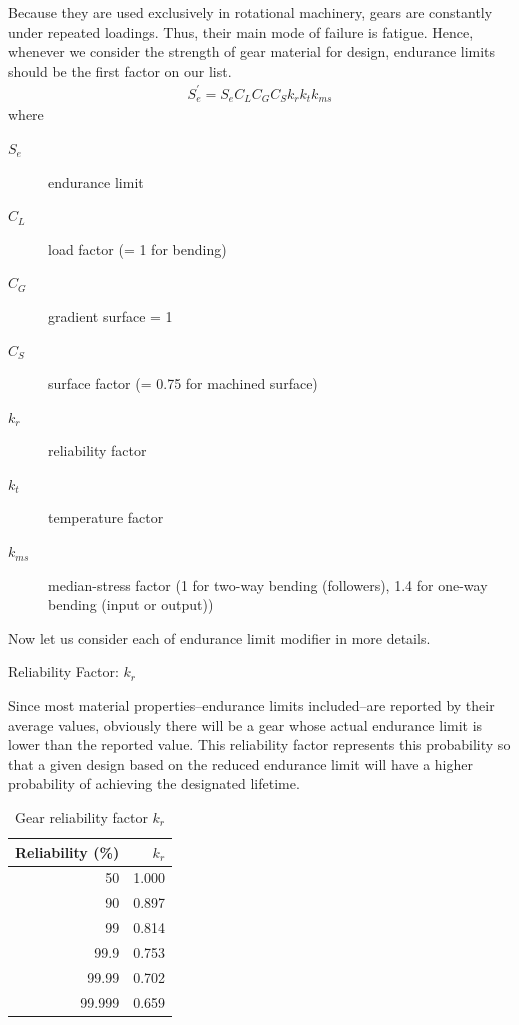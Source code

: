 \documentclass[a4paper,openany]{tufte-book}
\begin{document}
Because they are used exclusively in rotational machinery, gears are constantly under repeated loadings. Thus, their main mode of failure is fatigue. Hence, whenever we consider the strength of gear material for design, endurance limits should be the first factor on our list.
\begin{align}
  S_{e}^{\prime} = S_{e}C_{L}C_{G}C_{S}k_{r}k_{t}k_{ms}
\end{align}
where

\begin{description}
\item[{\(S_{e}\)}] endurance limit

\item[{\(C_{L}\)}] load factor (= 1 for bending)

\item[{\(C_{G}\)}] gradient surface = 1

\item[{\(C_{S}\)}] surface factor (= 0.75 for machined surface)

\item[{\(k_{r}\)}] reliability factor

\item[{\(k_{t}\)}] temperature factor

\item[{\(k_{ms}\)}] median-stress factor (1 for two-way bending (followers), 1.4 for one-way bending (input or output))
\end{description}

Now let us consider each of endurance limit modifier in more details.

Reliability Factor: \(k_{r}\)

Since most material properties--endurance limits included--are reported by their average values, obviously there will be a gear whose actual endurance limit is lower than the reported value. This reliability factor represents this probability so that a given design based on the reduced endurance limit will have a higher probability of achieving the designated lifetime.

\begin{table}[htbp]
\caption{\label{tab: gear reliability factor}Gear reliability factor \(k_r\)}
\centering
\begin{tabular}{rr}
\toprule
Reliability (\%) & \(k_{r}\)\\
\midrule
50 & 1.000\\
90 & 0.897\\
99 & 0.814\\
99.9 & 0.753\\
99.99 & 0.702\\
99.999 & 0.659\\
\bottomrule
\end{tabular}
\end{table}
\end{document}
